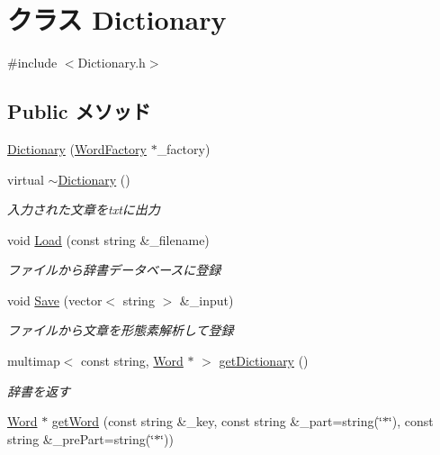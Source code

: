\hypertarget{class_dictionary}{\section{クラス Dictionary}
\label{class_dictionary}
}


{\ttfamily \#include $<$Dictionary.\-h$>$}

\subsection*{Public メソッド}
\begin{DoxyCompactItemize}
\item 
\hyperlink{class_dictionary_a2a9281bf1e720ec8df5cb48811a17960}{Dictionary} (\hyperlink{class_word_factory}{Word\-Factory} $\ast$\-\_\-factory)
\item 
virtual \hyperlink{class_dictionary_aa36f24073d9c9001768517aa2322cb82}{$\sim$\-Dictionary} ()
\begin{DoxyCompactList}\small\item\em 入力された文章をtxtに出力 \end{DoxyCompactList}\item 
void \hyperlink{class_dictionary_ae67a3b3381ea7abad6abbf97f8fa487d}{Load} (const string \&\-\_\-filename)
\begin{DoxyCompactList}\small\item\em ファイルから辞書データベースに登録 \end{DoxyCompactList}\item 
void \hyperlink{class_dictionary_a06a22c1c171e078c66a67aa8fc769071}{Save} (vector$<$ string $>$ \&\-\_\-input)
\begin{DoxyCompactList}\small\item\em ファイルから文章を形態素解析して登録 \end{DoxyCompactList}\item 
multimap$<$ const string, \hyperlink{class_word}{Word} $\ast$ $>$ \hyperlink{class_dictionary_ae3f70ff3810d1356e15780f2e0869489}{get\-Dictionary} ()
\begin{DoxyCompactList}\small\item\em 辞書を返す \end{DoxyCompactList}\item 
\hyperlink{class_word}{Word} $\ast$ \hyperlink{class_dictionary_aa727f50566a8e5cd42a95783ab5b422c}{get\-Word} (const string \&\-\_\-key, const string \&\-\_\-part=string(\char`\"{}$\ast$\char`\"{}), const string \&\-\_\-pre\-Part=string(\char`\"{}$\ast$\char`\"{}))

\end{DoxyCompactItemize}
